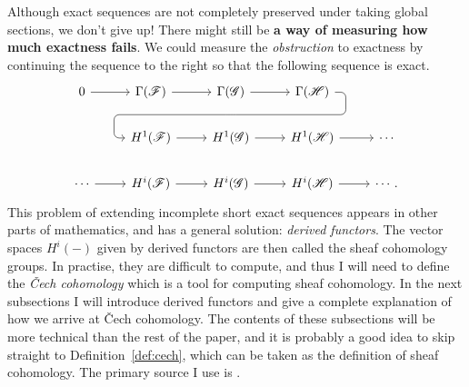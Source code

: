 Although exact sequences are not completely preserved under taking
global sections, we don't give up! There might still be \textbf{a way of
measuring how much exactness fails}. We could measure the
\emph{obstruction} to exactness by continuing the sequence to the right
so that the following sequence is exact.
\[
\begin{tikzcd}
  0 \rar & \Gamma(\mathscr{F}) \rar & \Gamma(\mathscr{G})
  \rar\dar[phantom, ""{coordinate, name=Z}] & \Gamma(\mathscr{H})
  \arrow[rounded corners, to path={ -- ([xshift=2ex]\tikztostart.east)
    |- (Z) -| ([xshift=-2ex]\tikztotarget.west) -- (\tikztotarget)},
  overlay]{dll} & \\
    & H^{1}(\mathscr{F}) \rar & H^{1}(\mathscr{G})
  \rar & H^{1}(\mathscr{H}) \rar & \cdots \\
  \cdots \rar& H^{i}(\mathscr{F}) \rar & H^{i}(\mathscr{G})
  \rar & H^{i}(\mathscr{H}) \rar & \cdots.
\end{tikzcd}
\]
This problem of extending incomplete short exact sequences appears
in other parts of mathematics, and has a general solution: \emph{derived functors}.
The vector spaces $H^{i}(-)$ given by
derived functors are then called the sheaf cohomology groups. In practise,
they are difficult to compute, and thus I will need to define the
\emph{\v Cech cohomology} which is a tool for computing sheaf cohomology.
In the next subsections I will introduce derived functors and give a complete
explanation of how we arrive at \v Cech cohomology. The contents of these
subsections will be more technical than the rest of the paper, and it is
probably a good idea to skip straight to Definition~\ref{def:cech},
which can be taken as the definition of sheaf cohomology. The
primary source I use is \cite{vakil}.

